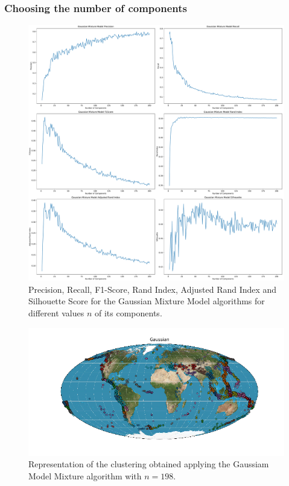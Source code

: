 \documentclass[a4paper]{article}
\begin{document}
 	\subsubsection{Choosing the number of components}
 	\begin{figure}
 		\includegraphics[width=\linewidth]{gmm_indeces.pdf}
 		\caption{Precision, Recall, F1-Score, Rand Index, Adjusted Rand Index and Silhouette Score for the Gaussian Mixture Model algorithms for different values $n$ of its components.}
 		\label{fig:gmm}
 	\end{figure}
 	\begin{figure}
 	\includegraphics[width=\linewidth]{Gaussian.png}
 	\caption{Representation of the clustering obtained applying the Gaussiam Model Mixture algorithm with $n= 198$.}
 	\label{fig:gmm_world}
 	\end{figure}
 
\end{document}
